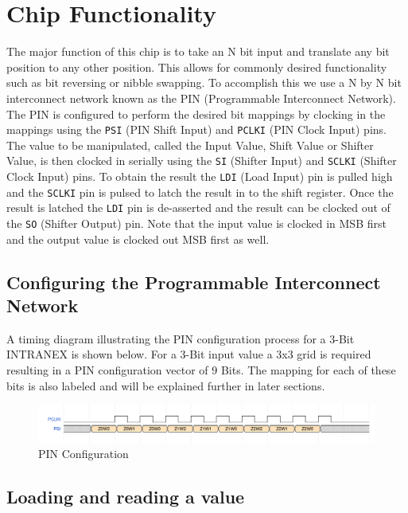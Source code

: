 \newpage
\section{Chip Functionality}

The major function of this chip is to take an N bit input and translate any bit
position to any other position. This allows for commonly desired functionality
such as bit reversing or nibble swapping. To accomplish this we use a N by N
bit interconnect network known as the PIN (Programmable Interconnect Network).
The PIN is configured to perform the desired bit mappings by clocking in the
mappings using the \texttt{PSI} (PIN Shift Input) and \texttt{PCLKI} (PIN Clock
Input) pins.  The value to be manipulated, called  the Input Value, Shift Value
or Shifter Value, is then clocked in serially using the \texttt{SI} (Shifter
Input) and \texttt{SCLKI} (Shifter Clock Input) pins. To obtain the result the
\texttt{LDI} (Load Input) pin is pulled high and the \texttt{SCLKI} pin is
pulsed to latch the result in to the shift register. Once the result is latched
the \texttt{LDI} pin is de-asserted and the result can be clocked out of the
\texttt{SO} (Shifter Output) pin. Note that the input value is clocked in MSB
first and the output value is clocked out MSB first as well.

\subsection{Configuring the Programmable Interconnect Network}

A timing diagram illustrating the PIN configuration process for a 3-Bit
INTRANEX is shown below. For a 3-Bit input value a 3x3 grid is required
resulting in a PIN configuration vector of 9 Bits. The mapping for each of
these bits is also labeled and will be explained further in later sections.

\begin{figure}[H]
    \centering
    \includegraphics[width=\linewidth]{../waveforms/pin.png}
    \caption{PIN Configuration}
\end{figure}

\subsection{Loading and reading a value}

